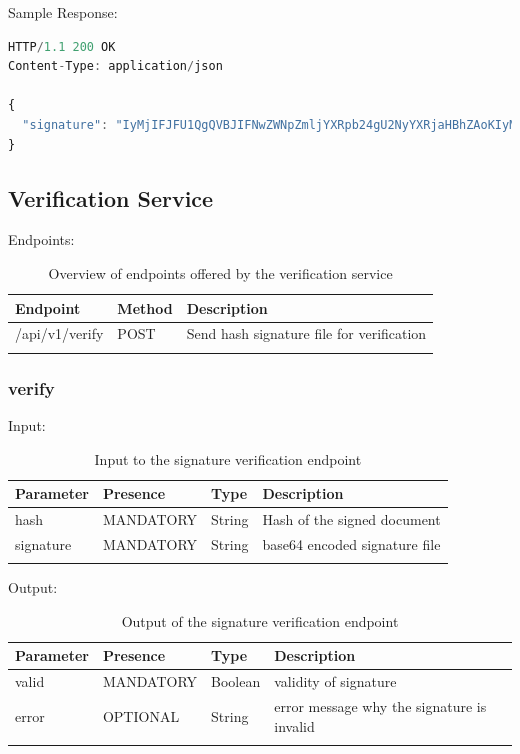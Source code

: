 Sample Response:

\begin{lstlisting}[caption={signature response}, captionpos=b, language=JavaScript, label={lst:signatureresponse}]
HTTP/1.1 200 OK
Content-Type: application/json

{
  "signature": "IyMjIFJFU1QgQVBJIFNwZWNpZmljYXRpb24gU2NyYXRjaHBhZAoKIyMjIyBQcmUtQXV0aCBlbmRw...b2ludCAKIyMjIyMgRW5kcG9pbnQKYGBgUE9TVCAvYXBpL3YxL3NpZ25gYGAK"
}
\end{lstlisting}

\subsection{Verification Service}
Endpoints:

\begin{longtable}{|l|l|l|}
	\hline
	\textbf{Endpoint} & \textbf{Method} & \textbf{Description} \\ \hline
	/api/v1/verify & POST & Send hash signature file for verification \\ \hline
	\caption{Overview of endpoints offered by the verification service}
\end{longtable}

\subsubsection{verify}
Input:

\begin{longtable}{|l|l|l|l|}
	\hline
	\textbf{Parameter} & \textbf{Presence} & \textbf{Type} & \textbf{Description} \\ \hline
	hash & MANDATORY & String & Hash of the signed document \\ \hline
	signature & MANDATORY & String & base64 encoded signature file \\ \hline
    \caption{Input to the signature verification endpoint}
\end{longtable}

Output:

\begin{longtable}{|l|l|l|l|}
	\hline
	\textbf{Parameter} & \textbf{Presence} & \textbf{Type} & \textbf{Description} \\ \hline
	valid & MANDATORY & Boolean & validity of signature \\ \hline
	error & OPTIONAL & String & error message why the signature is invalid \\ \hline
	\caption{Output of the signature verification endpoint}
\end{longtable}


